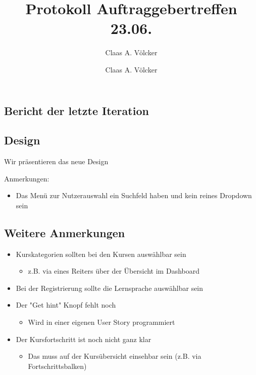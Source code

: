 \documentclass[colorback, accentcolor=tud1c, paper=a4]{tudexercise}
\title{Protokoll Auftraggebertreffen 23.06.}
\subtitle{Claas A. Völcker}
\author{Claas A. Völcker}
\begin{document}
	
\maketitle

\begin{multicols}{2}

\section{Bericht der letzte Iteration}
\subsection{Design}
Wir präsentieren das neue Design

Anmerkungen:
\begin{itemize}
\item Das Menü zur Nutzerauswahl ein Suchfeld haben und kein reines Dropdown sein
\end{itemize}

\subsection{Weitere Anmerkungen}
\begin{itemize}
\item Kurskategorien sollten bei den Kursen auswählbar sein
	\begin{itemize}
	\item z.B. via eines Reiters über der Übersicht im Dashboard
	\end{itemize}
\item Bei der Registrierung sollte die Lernsprache auswählbar sein
\item Der "Get hint" Knopf fehlt noch
	\begin{itemize}
	\item Wird in einer eigenen User Story programmiert
	\end{itemize}
\item Der Kursfortschritt ist noch nicht ganz klar
	\begin{itemize}
	\item Das muss auf der Kursübersicht einsehbar sein (z.B. via Fortschrittsbalken)
	\end{itemize}
\end{itemize}


\end{multicols}
\end{document}

